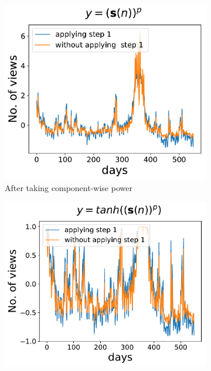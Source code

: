   \begin{figure}
      \begin{subfigure}[h]{0.5\textwidth}
          \includegraphics[width=\textwidth]{./description/images/compare_squeezed}
          \caption{ After taking component-wise power}
          \label{fig:compare_squeezed}
      \end{subfigure}
      \begin{subfigure}[h]{0.5\textwidth}
          \includegraphics[width=\textwidth]{./description/images/compare_tanh}

\end{subfigure}
\end{figure}
